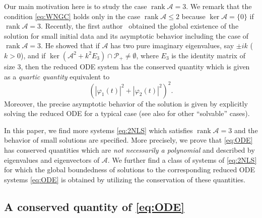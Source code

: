 \documentclass[11pt,a4paper,twosides]{amsart}
\theoremstyle{plain}
\theoremstyle{remark}
\numberwithin{equation}{section}
\def\le{\leqslant}
\DeclareMathOperator{\rank}{rank}
\theoremstyle{definition}
\newcommand{\1}{{\bf 1}_{\{|x| < |t|\}}}
\begin{document}
Our main motivation here is to study the case $\rank \mathscr{A} = 3$. 
We remark that the condition \eqref{eq:WNGC} holds only in the case $\rank \mathscr{A} \le 2$ 
because $\ker \mathscr{A}=\{0\}$ if $\rank \mathscr{A} = 3$.  
%
Recently, the first author~\cite{Ma3} obtained the global existence of the solution for small initial data and its asymptotic 
behavior including the case of $\rank \mathscr{A}=3$. 
He showed that if $\mathscr{A}$ has two pure imaginary eigenvalues, say $\pm ik$ ($k>0$), and if 
$\ker (\mathscr{A}^2 + k^2 E_3) \cap \mathcal{P}_+ \neq \emptyset$, where $E_3$ is the identity matrix of size 3,
 then
the reduced ODE system has the conserved quantity 
which is given as a \emph{quartic quantity} equivalent to 
\begin{equation}
  (|\varphi_1(t)|^2+|\varphi_2(t)|^2)^2. 
\end{equation}
Moreover, the precise asymptotic behavior of the solution is given by explicitly solving the reduced ODE 
for a typical case
(see also \cite{Ma2} for other ``solvable'' cases).

In this paper, we find more systems \eqref{eq:2NLS} which satisfies $\rank \mathscr{A}=3$ and the behavior of small solutions are specified.
More precisely, we prove that \eqref{eq:ODE} has conserved quantities 
which are \emph{not necessarily a polynomial} and described by eigenvalues and eigenvectors of $\mathscr{A}$.
We further find a class of systems of \eqref{eq:2NLS}
for which the global boundedness of solutions to
the corresponding reduced ODE systems \eqref{eq:ODE} is obtained
by utilizing the conservation of these quantities.
%




\subsection{A conserved quantity of \eqref{eq:ODE}}
\end{document}
